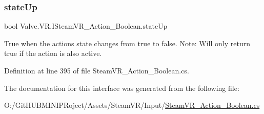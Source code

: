 \subsubsection{\texorpdfstring{stateUp}{stateUp}}
{\footnotesize\ttfamily bool Valve.\+V\+R.\+I\+Steam\+V\+R\+\_\+\+Action\+\_\+\+Boolean.\+state\+Up\hspace{0.3cm}{\ttfamily [get]}}



True when the action\textquotesingle{}s state changes from true to false. Note\+: Will only return true if the action is also active. 



Definition at line 395 of file Steam\+V\+R\+\_\+\+Action\+\_\+\+Boolean.\+cs.



The documentation for this interface was generated from the following file\+:\begin{DoxyCompactItemize}
\item 
O\+:/\+Git\+H\+U\+B\+M\+I\+N\+I\+P\+Roject/\+Assets/\+Steam\+V\+R/\+Input/\mbox{\hyperlink{_steam_v_r___action___boolean_8cs}{Steam\+V\+R\+\_\+\+Action\+\_\+\+Boolean.\+cs}}\end{DoxyCompactItemize}
